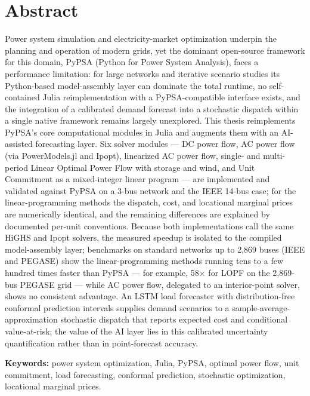 \chapter*{Abstract}

Power system simulation and electricity-market optimization underpin the planning and operation of modern grids, yet the dominant open-source framework for this domain, PyPSA (Python for Power System Analysis), faces a performance limitation: for large networks and iterative scenario studies its Python-based model-assembly layer can dominate the total runtime, no self-contained Julia reimplementation with a PyPSA-compatible interface exists, and the integration of a calibrated demand forecast into a stochastic dispatch within a single native framework remains largely unexplored. This thesis reimplements PyPSA's core computational modules in Julia and augments them with an AI-assisted forecasting layer. Six solver modules --- DC power flow, AC power flow (via PowerModels.jl and Ipopt), linearized AC power flow, single- and multi-period Linear Optimal Power Flow with storage and wind, and Unit Commitment as a mixed-integer linear program --- are implemented and validated against PyPSA on a 3-bus network and the IEEE 14-bus case; for the linear-programming methods the dispatch, cost, and locational marginal prices are numerically identical, and the remaining differences are explained by documented per-unit conventions. Because both implementations call the same HiGHS and Ipopt solvers, the measured speedup is isolated to the compiled model-assembly layer; benchmarks on standard networks up to 2{,}869 buses (IEEE and PEGASE) show the linear-programming methods running tens to a few hundred times faster than PyPSA --- for example, 58$\times$ for LOPF on the 2{,}869-bus PEGASE grid --- while AC power flow, delegated to an interior-point solver, shows no consistent advantage. An LSTM load forecaster with distribution-free conformal prediction intervals supplies demand scenarios to a sample-average-approximation stochastic dispatch that reports expected cost and conditional value-at-risk; the value of the AI layer lies in this calibrated uncertainty quantification rather than in point-forecast accuracy.

\vspace{1em}
\noindent\textbf{Keywords:} power system optimization, Julia, PyPSA, optimal power flow, unit commitment, load forecasting, conformal prediction, stochastic optimization, locational marginal prices.
